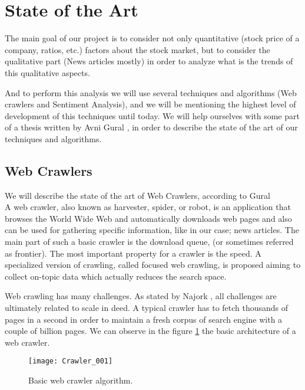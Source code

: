 	\section{State of the Art}
	
	The main goal of our project is to consider not only quantitative (stock price of a company, ratios, etc.) factors about the stock market, but to consider the qualitative part (News articles mostly) in order to analyze what is the trends of this qualitative aspects.

	And to perform this analysis we will use several techniques and algorithms (Web crawlers and Sentiment Analysis), and we will be mentioning the highest level of development of this techniques until today. We will help ourselves with some part of a thesis written by Avni Gural \cite{V2013}, in order to describe the state of the art of our techniques and algorithms.
	
	\subsection{Web Crawlers}
	
	We will describe the state of the art of Web Crawlers, according to Gural \cite{V2013}
	\\ A web crawler, also known as harvester, spider, or robot, is an application that browses the World Wide Web and automatically downloads web pages and also can be used for gathering specific information, like in our case; news articles. The main part of such a basic crawler is the download queue, (or sometimes referred as frontier). The most important property for a crawler is the speed. A specialized version of crawling, called focused web crawling, is proposed aiming to collect on-topic data which actually reduces the search space.
			
	Web crawling has many challenges. As stated by Najork \cite[p. 3462-3465]{N2009}, all challenges are ultimately related to scale in deed. A typical crawler has to fetch thousands of pages in a second in order to maintain a fresh corpus of search engine with a couple of billion pages. We can observe in the figure \ref{fig:Crawler_001} the basic architecture of a web crawler.
	
	\begin{figure}\centering
		\texttt{[image: Crawler\_001]}
		\caption{Basic web crawler algorithm.}\label{fig:Crawler_001}
	\end{figure}
		
